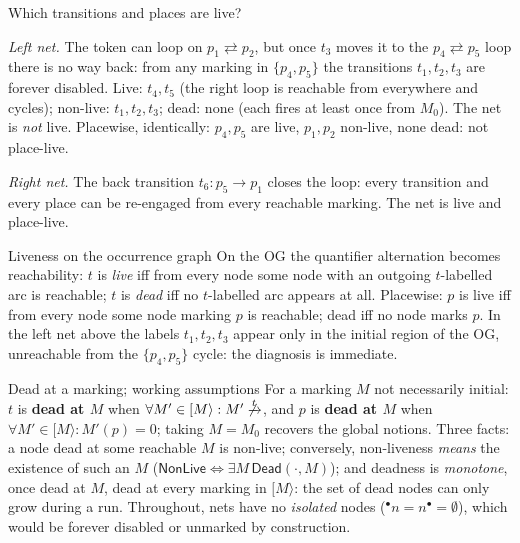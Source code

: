 \begin{examplebox}{Which transitions and places are live?}
\begin{center}
\end{center}
\emph{Left net.} The token can loop on $p_1 \rightleftarrows p_2$, but once $t_3$ moves it to the $p_4 \rightleftarrows p_5$ loop there is no way back: from any marking in $\{p_4, p_5\}$ the transitions $t_1, t_2, t_3$ are forever disabled. Live: $t_4, t_5$ (the right loop is reachable from everywhere and cycles); non-live: $t_1, t_2, t_3$; dead: none (each fires at least once from $M_0$). The net is \emph{not} live. Placewise, identically: $p_4, p_5$ are live, $p_1, p_2$ non-live, none dead: not place-live.
\par\smallskip
\emph{Right net.} The back transition $t_6 : p_5 \to p_1$ closes the loop: every transition and every place can be re-engaged from every reachable marking. The net is live and place-live.
\end{examplebox}

\begin{notebox}{Liveness on the occurrence graph}
On the OG the quantifier alternation becomes reachability: $t$ is \emph{live} iff from every node some node with an outgoing $t$-labelled arc is reachable; $t$ is \emph{dead} iff no $t$-labelled arc appears at all. Placewise: $p$ is live iff from every node some node marking $p$ is reachable; dead iff no node marks $p$. In the left net above the labels $t_1, t_2, t_3$ appear only in the initial region of the OG, unreachable from the $\{p_4, p_5\}$ cycle: the diagnosis is immediate.
\end{notebox}

\begin{definitionbox}{Dead at a marking; working assumptions}
For a marking $M$ not necessarily initial: $t$ is \textbf{dead at $M$} when $\forall M' \in [M\rangle : M' \not\xrightarrow{t}$, and $p$ is \textbf{dead at $M$} when $\forall M' \in [M\rangle : M'(p) = 0$; taking $M = M_0$ recovers the global notions. Three facts: a node dead at some reachable $M$ is non-live; conversely, non-liveness \emph{means} the existence of such an $M$ ($\mathsf{NonLive} \Leftrightarrow \exists M\, \mathsf{Dead}(\cdot, M)$); and deadness is \emph{monotone}, once dead at $M$, dead at every marking in $[M\rangle$: the set of dead nodes can only grow during a run. Throughout, nets have no \emph{isolated} nodes (${}^\bullet n = n^\bullet = \emptyset$), which would be forever disabled or unmarked by construction.
\end{definitionbox}

